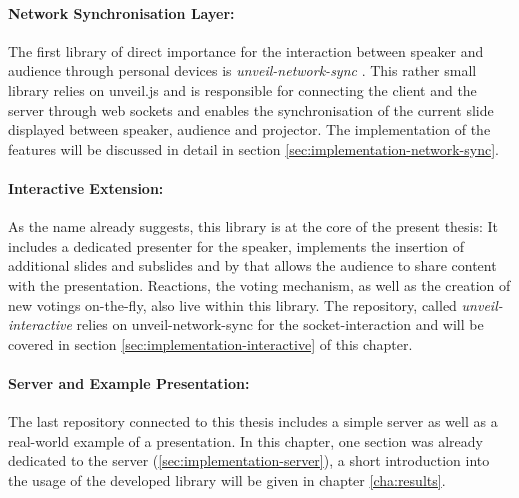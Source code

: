 \paragraph{Network Synchronisation Layer:} The first library of direct importance for the interaction between speaker and audience through personal devices is \textit{unveil-network-sync} \cite{unveil-network-sync}. This rather small library relies on unveil.js and is responsible for connecting the client and the server through web sockets and enables the synchronisation of the current slide displayed between speaker, audience and projector. The implementation of the features will be discussed in detail in section \ref{sec:implementation-network-sync}.

\paragraph{Interactive Extension:} As the name already suggests, this library is at the core of the present thesis: It includes a dedicated presenter for the speaker, implements the insertion of additional slides and subslides and by that allows the audience to share content with the presentation. Reactions, the voting mechanism, as well as the creation of new votings on-the-fly, also live within this library. The repository, called \emph{unveil-interactive} \cite{unveil-interactive} relies on unveil-network-sync for the socket-interaction and will be covered in section \ref{sec:implementation-interactive} of this chapter.

\paragraph{Server and Example Presentation:} The last repository connected to this thesis \cite{unveil-client-server} includes a simple server as well as a real-world example of a presentation. In this chapter, one section was already dedicated to the server (\ref{sec:implementation-server}), a short introduction into the usage of the developed library will be given in chapter \ref{cha:results}.

